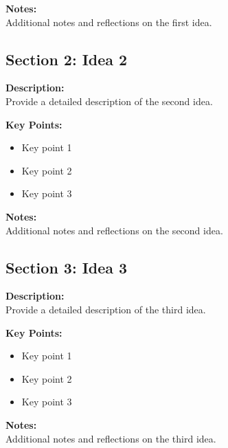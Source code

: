 \documentclass[a4paper, 12pt]{article}
\begin{document}
\noindent
\textbf{Notes:} \\
Additional notes and reflections on the first idea.

\vspace{1cm}

\subsection*{Section 2: Idea 2}
\noindent
\textbf{Description:} \\
Provide a detailed description of the second idea.

\vspace{0.5cm}

\noindent
\textbf{Key Points:}
\begin{itemize}
    \item Key point 1
    \item Key point 2
    \item Key point 3
\end{itemize}

\vspace{0.5cm}

\noindent
\textbf{Notes:} \\
Additional notes and reflections on the second idea.

\vspace{1cm}

\subsection*{Section 3: Idea 3}
\noindent
\textbf{Description:} \\
Provide a detailed description of the third idea.

\vspace{0.5cm}

\noindent
\textbf{Key Points:}
\begin{itemize}
    \item Key point 1
    \item Key point 2
    \item Key point 3
\end{itemize}

\vspace{0.5cm}

\noindent
\textbf{Notes:} \\
Additional notes and reflections on the third idea.

\vspace{1cm}
\end{document}
